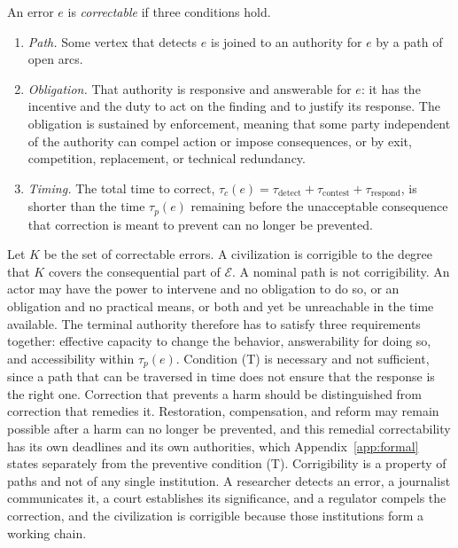 \documentclass[11pt]{article}
\begin{document}
An error $e$ is \emph{correctable} if three conditions hold.
\begin{enumerate}
\item[(P)] \emph{Path.} Some vertex that detects $e$ is joined to an authority for $e$ by a path of open arcs.
\item[(O)] \emph{Obligation.} That authority is responsive and answerable for $e$: it has the incentive and the duty to act on the finding and to justify its response. The obligation is sustained by enforcement, meaning that some party independent of the authority can compel action or impose consequences, or by exit, competition, replacement, or technical redundancy.
\item[(T)] \emph{Timing.} The total time to correct, $\tau_c(e)=\tau_{\text{detect}}+\tau_{\text{contest}}+\tau_{\text{respond}}$, is shorter than the time $\tau_p(e)$ remaining before the unacceptable consequence that correction is meant to prevent can no longer be prevented.
\end{enumerate}
Let $K$ be the set of correctable errors. A civilization is corrigible to the degree that $K$ covers the consequential part of $\mathcal{E}$. A nominal path is not corrigibility. An actor may have the power to intervene and no obligation to do so, or an obligation and no practical means, or both and yet be unreachable in the time available. The terminal authority therefore has to satisfy three requirements together: effective capacity to change the behavior, answerability for doing so, and accessibility within $\tau_p(e)$. Condition (T) is necessary and not sufficient, since a path that can be traversed in time does not ensure that the response is the right one. Correction that prevents a harm should be distinguished from correction that remedies it. Restoration, compensation, and reform may remain possible after a harm can no longer be prevented, and this remedial correctability has its own deadlines and its own authorities, which Appendix~\ref{app:formal} states separately from the preventive condition (T). Corrigibility is a property of paths and not of any single institution. A researcher detects an error, a journalist communicates it, a court establishes its significance, and a regulator compels the correction, and the civilization is corrigible because those institutions form a working chain.
\end{document}
